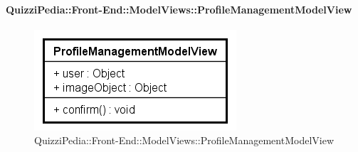 	\paragraph[QuizziPedia::Front-End::ModelViews\\::ProfileManagementModelView]{QuizziPedia::Front-End::ModelViews::ProfileManagementModelView}
	
	\label{QuizziPedia::Front-End::ModelViews::ProfileManagementModelView}
	
	\begin{figure}[ht]
		\centering
		\includegraphics[scale=0.80,keepaspectratio]{UML/Classi/Front-End/QuizziPedia_Front-end_ModelView_ProfileManagementModelView.png}
		\caption{QuizziPedia::Front-End::ModelViews::ProfileManagementModelView}
	\end{figure} \FloatBarrier
	
